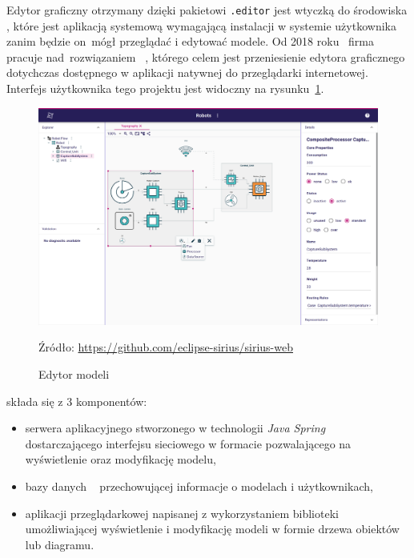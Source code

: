Edytor graficzny otrzymany dzięki pakietowi \texttt{.editor} jest wtyczką do
środowiska \Eclipse{}, które jest aplikacją systemową wymagającą instalacji
w systemie użytkownika zanim będzie on~mógł przeglądać i edytować modele.
Od 2018 roku~\cite{sirius-components-repo-first-commit} firma \Eclipse{}
pracuje nad~rozwiązaniem \SiriusWeb{}~\cite{sirius-web-github}, którego
celem jest przeniesienie edytora
graficznego dotychczas dostępnego w aplikacji natywnej do przeglądarki
internetowej. Interfejs użytkownika tego projektu jest widoczny na
rysunku~\ref{rys:sirius-web-ui}.

\begin{figure}[!ht]
	\centering

	\includegraphics[width=0.95\linewidth]
	{./images/sirius-web-editor.png}
	\caption{Edytor modeli \SiriusWeb{}}\label{rys:sirius-web-ui}
	{\small Źródło: \url{https://github.com/eclipse-sirius/sirius-web}}
\end{figure}

\SiriusWeb{} składa się z 3 komponentów:

\begin{itemize}
	\item serwera aplikacyjnego stworzonego w technologii \emph{Java
		      Spring}~\cite{java-spring-homepage} dostarczającego interfejsu sieciowego  w formacie \GraphQL{} pozwalającego na wyświetlenie oraz modyfikację modelu,
	\item bazy danych \PostgreSQL{}~\cite{postgresql-homepage} przechowującej informacje o modelach i użytkownikach,
	\item aplikacji przeglądarkowej napisanej z wykorzystaniem biblioteki \React{}~\cite{react-homepage} umożliwiającej wyświetlenie i modyfikację modeli w formie drzewa obiektów lub diagramu.
\end{itemize}

